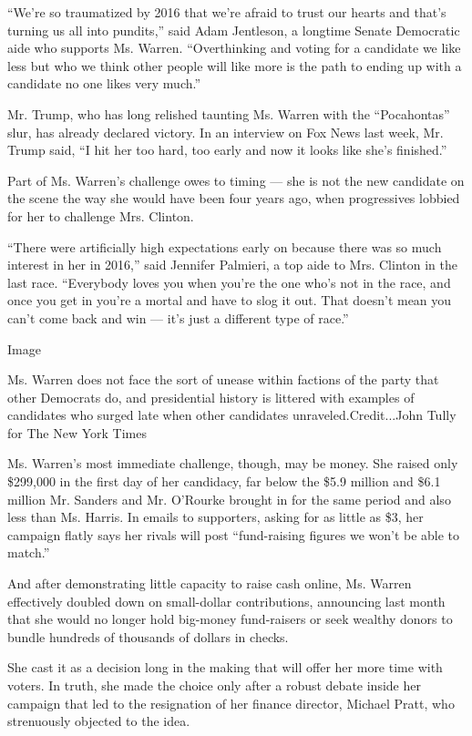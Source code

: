 ``We're so traumatized by 2016 that we're afraid to trust our hearts and
that's turning us all into pundits,'' said Adam Jentleson, a longtime
Senate Democratic aide who supports Ms. Warren. ``Overthinking and
voting for a candidate we like less but who we think other people will
like more is the path to ending up with a candidate no one likes very
much.''

Mr. Trump, who has long relished taunting Ms. Warren with the
``Pocahontas'' slur, has already declared victory. In an interview on
Fox News last week, Mr. Trump said, ``I hit her too hard, too early and
now it looks like she's finished.''

Part of Ms. Warren's challenge owes to timing --- she is not the new
candidate on the scene the way she would have been four years ago, when
progressives lobbied for her to challenge Mrs. Clinton.

``There were artificially high expectations early on because there was
so much interest in her in 2016,'' said Jennifer Palmieri, a top aide to
Mrs. Clinton in the last race. ``Everybody loves you when you're the one
who's not in the race, and once you get in you're a mortal and have to
slog it out. That doesn't mean you can't come back and win --- it's just
a different type of race.''

Image

Ms. Warren does not face the sort of unease within factions of the party
that other Democrats do, and presidential history is littered with
examples of candidates who surged late when other candidates
unraveled.Credit...John Tully for The New York Times

 Ms. Warren's most immediate challenge, though, may be money. She raised
only \$299,000 in the first day of her candidacy, far below the \$5.9
million and \$6.1 million Mr. Sanders and Mr. O'Rourke brought in for
the same period and also less than Ms. Harris. In emails to supporters,
asking for as little as \$3, her campaign flatly says her rivals will
post ``fund-raising figures we won't be able to match.''

And after demonstrating little capacity to raise cash online, Ms. Warren
effectively doubled down on small-dollar contributions, announcing last
month that she would no longer hold big-money fund-raisers or seek
wealthy donors to bundle hundreds of thousands of dollars in checks.

She cast it as a decision long in the making that will offer her more
time with voters. In truth, she made the choice only after a robust
debate inside her campaign that led to the resignation of her finance
director, Michael Pratt, who strenuously objected to the idea.

